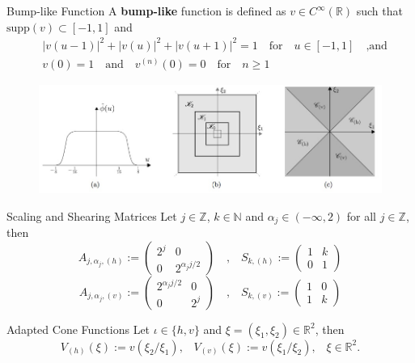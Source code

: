 \begin{frame}
\begin{block}{Bump-like Function}
A \textbf{bump-like} function is defined as $v\in C^{\infty}(\mathbb{R})$ such that $\text{supp}(v)\subset[-1,1]$ and 
$$
\begin{aligned}
& |v(u-1)|^2+|v(u)|^2+|v(u+1)|^2 = 1 \quad \textrm{for} \quad u\in[-1,1] \quad \textrm{,and}\\
& v(0)=1 \quad \textrm{and} \quad v^{(n)}(0)=0\quad\textrm{for}\quad n\geq 1
\end{aligned}
$$
\end{block}
\begin{figure}[h!]
\includegraphics[width=\textwidth]{../../Diagrams/alphapartcones.jpg}
\end{figure}
\end{frame}

\begin{frame}
\begin{block}{Scaling and Shearing Matrices}
Let $j\in\mathbb{Z}$, $k\in\mathbb{N}$ and $\alpha_j\in (-\infty,2)$ for all $j\in\mathbb{Z}$, then
$$
A_{j,\alpha_j,(h)}:=\left(\begin{matrix} 2^j & 0 \\ 0 & 2^{\alpha_jj/2}\end{matrix}\right) \quad \textrm{,}\quad S_{k,(h)}:=\left(\begin{matrix} 1 & k\\ 0 & 1\end{matrix}\right)
$$
$$
A_{j,\alpha_j,(v)}:=\left(\begin{matrix}2^{\alpha_j j/2} & 0 \\ 0 & 2^j \end{matrix}\right)\quad \textrm{,}\quad S_{k,(v)}:=\left(\begin{matrix} 1 & 0 \\ 1 & k\end{matrix}\right)
$$
\end{block}
\bigskip
\pause
\begin{block}{Adapted Cone Functions}
Let $\iota\in\{h,v\}$ and $\xi=(\xi_1,\xi_2)\in\mathbb{R}^2$, then
$$
V_{(h)}(\xi):=v(\xi_2/\xi_1)\textrm{,}\quad V_{(v)}(\xi):=v(\xi_1/\xi_2)\textrm{,}\quad \xi\in\mathbb{R}^2.
$$
\end{block}
\end{frame}

